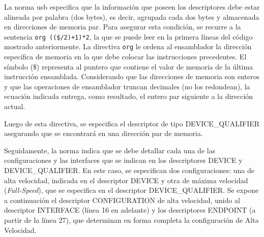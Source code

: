 	La norma \acrshort{usb} especifica que la información que poseen los descriptores debe estar alineada por palabra (dos bytes), es decir, agrupada cada dos bytes y almacenada en direcciones de memoria par. Para asegurar esta condición, se recurre a la sentencia \verb|org (($/2)+1)*2|, la que se puede leer en la primera líneas del código mostrado anteriormente. La directiva \verb|org| le ordena al ensamblador la dirección específica de memoria en la que debe colocar las instrucciones precedentes. El símbolo (\$) representa al puntero que contiene el valor de memoria de la última instrucción ensamblada. Considerando que las direcciones de memoria son enteros y que las operaciones de ensamblador truncan decimales (no los redondean), la ecuación indicada entrega, como resultado, el entero par siguiente a la dirección actual. 

	Luego de esta directiva, se especifica el descriptor de tipo DEVICE\_QUALIFIER asegurando que se encontrará en una dirección par de memoria.
	
	Seguidamente, la norma indica que se debe detallar cada una de las configuraciones y las interfaces que se indican en los descriptores DEVICE y DEVICE\_QUALIFIER. En este caso, se especifican dos configuraciones: una de alta velocidad, indicada en el descriptor DEVICE y otra de máxima velocidad ({\it Full-Speed}), que se especifica en el descriptor DEVICE\_QUALIFIER. Se expone a continuación el descriptor CONFIGURATION de alta velocidad, unido al descriptor INTERFACE (línea 16 en adelante) y los descriptores ENDPOINT (a partir de la línea 27), que determinan en forma completa la configuración de Alta Velocidad.
	
